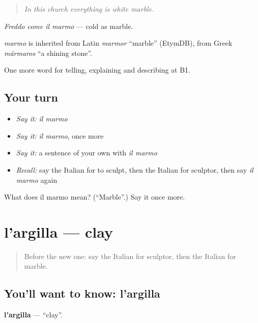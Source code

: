 \begin{quote}
\emph{In this church everything is white marble.}
\end{quote}

\emph{Freddo come il marmo} — cold as marble.

\begin{cousinweb}
\emph{marmo} is inherited from Latin \emph{marmor} \textquotedblleft{}marble\textquotedblright{} (EtymDB), from Greek \emph{mármaros} \textquotedblleft{}a shining stone\textquotedblright{}.
\end{cousinweb}

\begin{grammarlens}[title={What you've built}]
One more word for telling, explaining and describing at B1.
\end{grammarlens}

\subsection*{Your turn}
\begin{itemize}
\raggedright
  \item \emph{Say it:} \emph{il marmo}
  \item \emph{Say it:} \emph{il marmo}, once more
  \item \emph{Say it:} a sentence of your own with \emph{il marmo}
  \item \emph{Recall:} say the Italian for to sculpt, then the Italian for sculptor, then say \emph{il marmo} again
\end{itemize}

\begin{tcolorbox}[breakable,colback=teal!4,colframe=teal!35!black,title={Before you move on}]
What does il marmo mean? (\textquotedblleft{}Marble\textquotedblright{}.) Say it once more.
\end{tcolorbox}
\section[l'argilla]{l'argilla — clay}

\label{lesson:IT-C522-argilla}



\begin{quote}
Before the new one: say the Italian for sculptor, then the Italian for marble.
\end{quote}

\subsection*{You'll want to know: l'argilla}
\textbf{l'argilla} — \textquotedblleft{}clay\textquotedblright{}.

